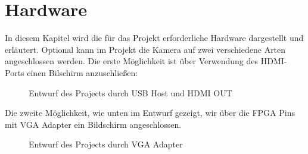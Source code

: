\documentclass[a4paper]{report}
\begin{document}

\chapter{Hardware}

In diesem Kapitel wird die für das Projekt erforderliche Hardware dargestellt und erläutert. Optional kann im Projekt die Kamera auf zwei verschiedene Arten angeschlossen werden. Die erste Möglichkeit ist über Verwendung des HDMI-Ports einen Bilschirm anzuschließen:
	\begin{figure}[H]
	\centering
	\caption{Entwurf des Projects durch USB Host und HDMI OUT}
	\label{Entwurf des Projects durch_USB_Host_und_HDMI_OUT}
	\end{figure}

Die zweite Möglichkeit, wie unten im Entwurf gezeigt, wir über die FPGA Pins mit VGA Adapter ein Bildschirm angeschlossen.
	\begin{figure}[H]
	\centering
	\caption{Entwurf des Projects durch VGA Adapter}
	\label{Entwurf des Projects durch_VGA_Adapter}
	\end{figure}
	
\end{document}
